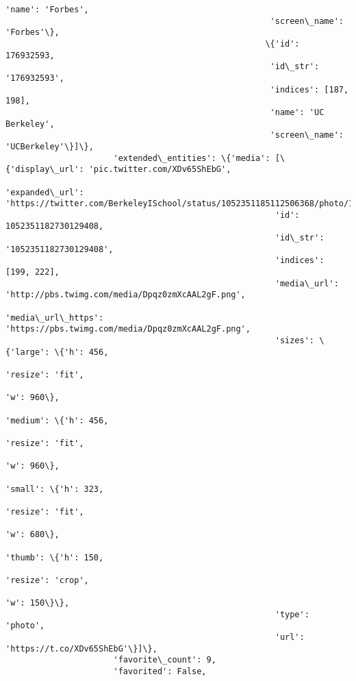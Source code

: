 \documentclass[11pt]{article}
\begin{document}
\begin{Verbatim}[commandchars=\\\{\}]
                                                      'name': 'Forbes',
                                                      'screen\_name': 'Forbes'\},
                                                     \{'id': 176932593,
                                                      'id\_str': '176932593',
                                                      'indices': [187, 198],
                                                      'name': 'UC Berkeley',
                                                      'screen\_name': 'UCBerkeley'\}]\},
                      'extended\_entities': \{'media': [\{'display\_url': 'pic.twitter.com/XDv65ShEbG',
                                                       'expanded\_url': 'https://twitter.com/BerkeleyISchool/status/1052351185112506368/photo/1',
                                                       'id': 1052351182730129408,
                                                       'id\_str': '1052351182730129408',
                                                       'indices': [199, 222],
                                                       'media\_url': 'http://pbs.twimg.com/media/Dpqz0zmXcAAL2gF.png',
                                                       'media\_url\_https': 'https://pbs.twimg.com/media/Dpqz0zmXcAAL2gF.png',
                                                       'sizes': \{'large': \{'h': 456,
                                                                           'resize': 'fit',
                                                                           'w': 960\},
                                                                 'medium': \{'h': 456,
                                                                            'resize': 'fit',
                                                                            'w': 960\},
                                                                 'small': \{'h': 323,
                                                                           'resize': 'fit',
                                                                           'w': 680\},
                                                                 'thumb': \{'h': 150,
                                                                           'resize': 'crop',
                                                                           'w': 150\}\},
                                                       'type': 'photo',
                                                       'url': 'https://t.co/XDv65ShEbG'\}]\},
                      'favorite\_count': 9,
                      'favorited': False,

\end{Verbatim}
\end{document}
